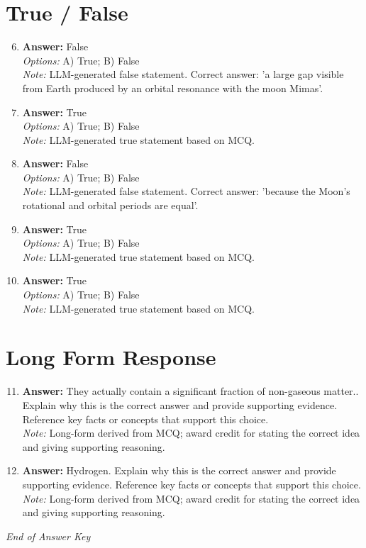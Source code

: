 \documentclass[12pt]{article}
\begin{document}
\section*{True / False}
\begin{enumerate}[label=\arabic*.]
\setcounter{enumi}{5}
\item \textbf{Answer:} False
\\ \textit{Options:} A) True; B) False
\\ \textit{Note:} LLM-generated false statement. Correct answer: 'a large gap visible from Earth produced by an orbital resonance with the moon Mimas'.
\item \textbf{Answer:} True
\\ \textit{Options:} A) True; B) False
\\ \textit{Note:} LLM-generated true statement based on MCQ.
\item \textbf{Answer:} False
\\ \textit{Options:} A) True; B) False
\\ \textit{Note:} LLM-generated false statement. Correct answer: 'because the Moon's rotational and orbital periods are equal'.
\item \textbf{Answer:} True
\\ \textit{Options:} A) True; B) False
\\ \textit{Note:} LLM-generated true statement based on MCQ.
\item \textbf{Answer:} True
\\ \textit{Options:} A) True; B) False
\\ \textit{Note:} LLM-generated true statement based on MCQ.
\end{enumerate}

\section*{Long Form Response}
\begin{enumerate}[label=\arabic*.]
\setcounter{enumi}{10}
\item \textbf{Answer:} They actually contain a significant fraction of non-gaseous matter.. Explain why this is the correct answer and provide supporting evidence. Reference key facts or concepts that support this choice.
\\ \textit{Note:} Long-form derived from MCQ; award credit for stating the correct idea and giving supporting reasoning.
\item \textbf{Answer:} Hydrogen. Explain why this is the correct answer and provide supporting evidence. Reference key facts or concepts that support this choice.
\\ \textit{Note:} Long-form derived from MCQ; award credit for stating the correct idea and giving supporting reasoning.
\end{enumerate}

\vfill
\noindent\textit{End of Answer Key}
\end{document}
